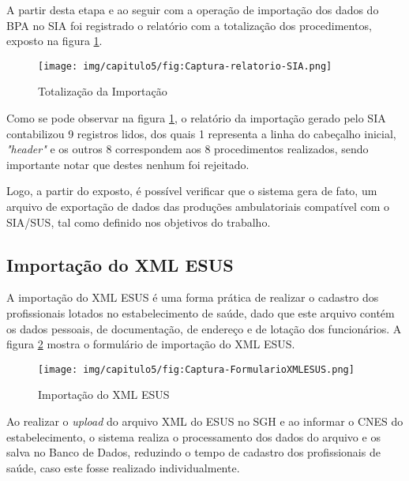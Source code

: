 A partir desta etapa e ao seguir com a operação de importação dos dados do BPA no SIA foi registrado o relatório com a totalização dos procedimentos, exposto na figura \ref{fig:Captura-relatorio-SIA}.

\begin{figure}[H]
    \centering
     \caption{Totalização da Importação}
    \texttt{[image: img/capitulo5/fig:Captura-relatorio-SIA.png]}
    \label{fig:Captura-relatorio-SIA}
\end{figure}

Como se pode observar na figura \ref{fig:Captura-relatorio-SIA}, o relatório da importação gerado pelo SIA contabilizou 9 registros lidos, dos quais 1 representa a linha do cabeçalho inicial, \textit{"header"} e os outros 8 correspondem aos 8 procedimentos realizados, sendo importante notar que destes nenhum foi rejeitado. 

Logo, a partir do exposto, é possível verificar que o sistema gera de fato, um arquivo de exportação de dados das produções ambulatoriais compatível com o SIA/SUS, tal como definido nos objetivos do trabalho.


\subsection{Importação do XML ESUS}

A importação do XML ESUS é uma forma prática de realizar o cadastro dos profissionais lotados no estabelecimento de saúde, dado que este arquivo contém os dados pessoais, de documentação, de endereço e de lotação dos funcionários. A figura \ref{fig:Captura-FormularioXMLESUS} mostra o formulário de importação do XML ESUS.

\begin{figure}[H]
    \centering
     \caption{Importação do XML ESUS}
    \texttt{[image: img/capitulo5/fig:Captura-FormularioXMLESUS.png]}
    \label{fig:Captura-FormularioXMLESUS}
\end{figure}

Ao realizar o \textit{upload} do arquivo XML do ESUS no SGH e ao informar o CNES do estabelecimento, o sistema realiza o processamento dos dados do arquivo e os salva no Banco de Dados, reduzindo o tempo de cadastro dos profissionais de saúde, caso este fosse realizado individualmente. 









